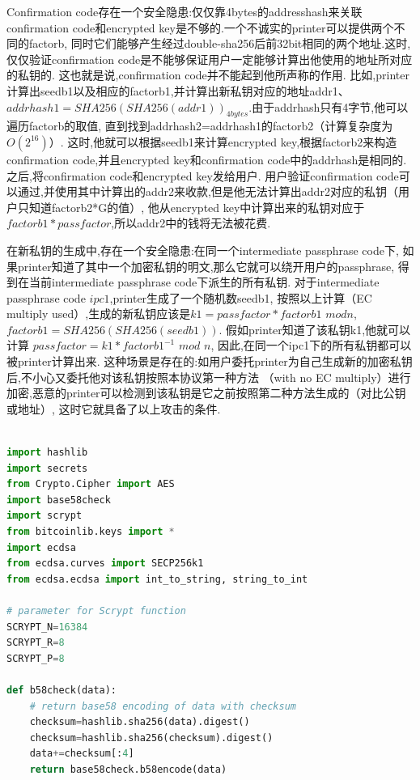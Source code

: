 Confirmation code存在一个安全隐患:仅仅靠4bytes的addresshash来关联
confirmation code和encrypted key是不够的.一个不诚实的printer可以提供两个不同的factorb,
同时它们能够产生经过double-sha256后前32bit相同的两个地址.这时,
仅仅验证confirmation code是不能够保证用户一定能够计算出他使用的地址所对应的私钥的.
这也就是说,confirmation code并不能起到他所声称的作用.
比如,printer计算出seedb1以及相应的factorb1,并计算出新私钥对应的地址addr1、
$addrhash1=SHA256(SHA256(addr1))_{4bytes}$.由于addrhash只有4字节,他可以遍历factorb的取值,
直到找到addrhash2=addrhash1的factorb2（计算复杂度为$O(2^{16})$）.
这时,他就可以根据seedb1来计算encrypted key,根据factorb2来构造confirmation code,并且encrypted key和confirmation 
code中的addrhash是相同的.之后,将confirmation code和encrypted key发给用户.
用户验证confirmation code可以通过,并使用其中计算出的addr2来收款,但是他无法计算出addr2对应的私钥（用户只知道factorb2*G的值）,
他从encrypted key中计算出来的私钥对应于 $factorb1 * passfactor$,所以addr2中的钱将无法被花费.

在新私钥的生成中,存在一个安全隐患:在同一个intermediate passphrase code下,
如果printer知道了其中一个加密私钥的明文,那么它就可以绕开用户的passphrase,
得到在当前intermediate passphrase code下派生的所有私钥.
 对于intermediate passphrase code $ipc1$,printer生成了一个随机数seedb1,
 按照以上计算（EC multiply used）,生成的新私钥应该是$k1=passfactor * factorb1$ 
 $mod n$, $factorb1=SHA256(SHA256(seedb1))$. 假如printer知道了该私钥k1,他就可以计算 
 $passfactor=k1 * factorb1^{-1}$ $mod$ $n$, 因此,在同一个ipc1下的所有私钥都可以被printer计算出来.  
这种场景是存在的:如用户委托printer为自己生成新的加密私钥后,不小心又委托他对该私钥按照本协议第一种方法
（with no EC multiply）进行加密,恶意的printer可以检测到该私钥是它之前按照第二种方法生成的（对比公钥或地址）,
这时它就具备了以上攻击的条件.

\begin{lstlisting}[language=python, caption = 测试代码, label=lst-baddersig]

import hashlib 
import secrets
from Crypto.Cipher import AES
import base58check
import scrypt
from bitcoinlib.keys import *
import ecdsa
from ecdsa.curves import SECP256k1
from ecdsa.ecdsa import int_to_string, string_to_int

# parameter for Scrypt function
SCRYPT_N=16384
SCRYPT_R=8
SCRYPT_P=8

def b58check(data):
	# return base58 encoding of data with checksum
	checksum=hashlib.sha256(data).digest()
	checksum=hashlib.sha256(checksum).digest()
	data+=checksum[:4]
	return base58check.b58encode(data)
\end{lstlisting}

